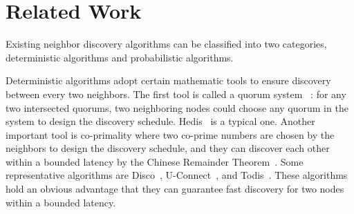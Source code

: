 \section{Related Work}
\label{RW}








Existing neighbor discovery algorithms can be classified into two categories, deterministic algorithms and probabilistic algorithms.

Deterministic algorithms adopt certain mathematic tools to ensure discovery between every two neighbors. The first tool is called a quorum system~\cite{jiang2005quorum,luk1997two} : for any two intersected quorums, two neighboring nodes could choose any quorum in the system to design the discovery schedule. Hedis~\cite{chen2015heterogeneous} is a typical one. Another important tool is co-primality where two co-prime numbers are chosen by the neighbors to design the discovery schedule, and they can discover each other within a bounded latency by the Chinese Remainder Theorem~\cite{ding1996chinese}. Some representative algorithms are Disco~\cite{dutta2008practical}, U-Connect~\cite{kandhalu2010u}, and Todis~\cite{chen2015heterogeneous}. These algorithms hold an obvious advantage that they can guarantee fast discovery for two nodes within a bounded latency. 

